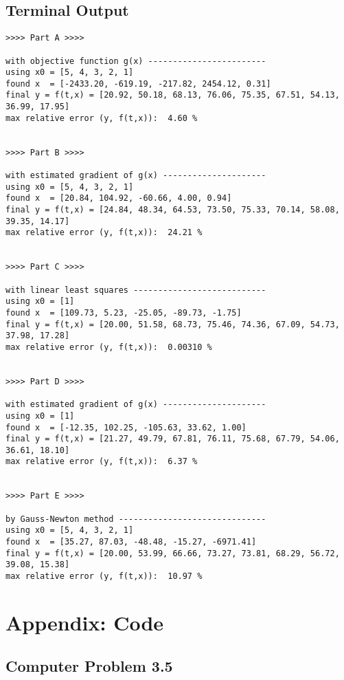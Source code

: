 \documentclass[paper=a4, fontsize=11pt]{scrartcl}
\numberwithin{equation}{section}		%
\numberwithin{figure}{section}			%
\numberwithin{table}{section}				%
\begin{document}
\vspace{4mm}
\subsection{Terminal Output}
\begin{verbatim}
>>>> Part A >>>>

with objective function g(x) ------------------------
using x0 = [5, 4, 3, 2, 1]
found x  = [-2433.20, -619.19, -217.82, 2454.12, 0.31]
final y = f(t,x) = [20.92, 50.18, 68.13, 76.06, 75.35, 67.51, 54.13, 36.99, 17.95]
max relative error (y, f(t,x)):  4.60 %


>>>> Part B >>>>

with estimated gradient of g(x) ---------------------
using x0 = [5, 4, 3, 2, 1]
found x  = [20.84, 104.92, -60.66, 4.00, 0.94]
final y = f(t,x) = [24.84, 48.34, 64.53, 73.50, 75.33, 70.14, 58.08, 39.35, 14.17]
max relative error (y, f(t,x)):  24.21 %


>>>> Part C >>>>

with linear least squares ---------------------------
using x0 = [1]
found x  = [109.73, 5.23, -25.05, -89.73, -1.75]
final y = f(t,x) = [20.00, 51.58, 68.73, 75.46, 74.36, 67.09, 54.73, 37.98, 17.28]
max relative error (y, f(t,x)):  0.00310 %


>>>> Part D >>>>

with estimated gradient of g(x) ---------------------
using x0 = [1]
found x  = [-12.35, 102.25, -105.63, 33.62, 1.00]
final y = f(t,x) = [21.27, 49.79, 67.81, 76.11, 75.68, 67.79, 54.06, 36.61, 18.10]
max relative error (y, f(t,x)):  6.37 %


>>>> Part E >>>>

by Gauss-Newton method ------------------------------
using x0 = [5, 4, 3, 2, 1]
found x  = [35.27, 87.03, -48.48, -15.27, -6971.41]
final y = f(t,x) = [20.00, 53.99, 66.66, 73.27, 73.81, 68.29, 56.72, 39.08, 15.38]
max relative error (y, f(t,x)):  10.97 %
\end{verbatim}




\pagebreak
\section{Appendix: Code}

\subsection{Computer Problem 3.5}

\end{document}
